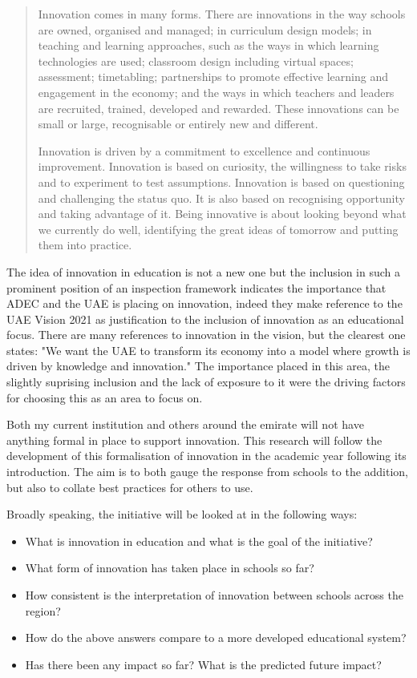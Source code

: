 \begin{quote}
Innovation comes in many forms. There are innovations in the way schools are owned, organised and managed; in curriculum design models; in teaching and learning approaches, such as the ways in which learning technologies are used; classroom design including virtual spaces; assessment; timetabling; partnerships to promote effective learning and engagement in the economy; and the ways in which teachers and leaders are recruited, trained, developed and rewarded. These innovations can be small or large, recognisable or entirely new and different.

Innovation is driven by a commitment to excellence and continuous improvement. Innovation is based on curiosity, the willingness to take risks and to experiment to test assumptions. Innovation is based on questioning and challenging the status quo. It is also based on recognising opportunity and taking advantage of it. Being innovative is about looking beyond what we currently do well, identifying the great ideas of tomorrow and putting them into practice.
\end{quote} \cite[p.12]{ADEC2015}

The idea of innovation in education is not a new one but the inclusion in such a prominent position of an inspection framework indicates the importance that ADEC and the UAE is placing on innovation, indeed they make reference to the UAE Vision 2021 as justification to the inclusion of innovation as an educational focus. There are many references to innovation in the vision, but the clearest one states: "We want the UAE to transform its economy into a model where growth is driven by knowledge and innovation." \cite{UAEGovernment2012} The importance placed in this area, the slightly suprising inclusion and the lack of exposure to it were the driving factors for choosing this as an area to focus on.

Both my current institution and others around the emirate will not have anything formal in place to support innovation. This research will follow the development of this formalisation of innovation in the academic year following its introduction. The aim is to both gauge the response from schools to the addition, but also to collate best practices for others to use.

Broadly speaking, the initiative will be looked at in the following ways: 

\begin{itemize}
\item What is innovation in education and what is the goal of the initiative?
\item What form of innovation has taken place in schools so far?
\item How consistent is the interpretation of innovation between schools across the region?
\item How do the above answers compare to a more developed educational system?
\item Has there been any impact so far? What is the predicted future impact?

\end{itemize}

